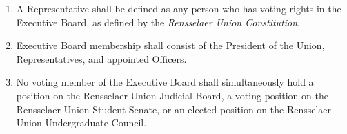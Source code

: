 \begin{enumerate}
    \item A Representative shall be defined as any person who has voting rights in the Executive Board, as defined by the \textit{Rensselaer Union Constitution}.
    \item Executive Board membership shall consist of the President of the Union, Representatives, and appointed Officers.
    \item No voting member of the Executive Board shall simultaneously hold a position on the Rensselaer Union Judicial Board, a voting position on the Rensselaer Union Student Senate, or an elected position on the Rensselaer Union Undergraduate Council.
\end{enumerate}
